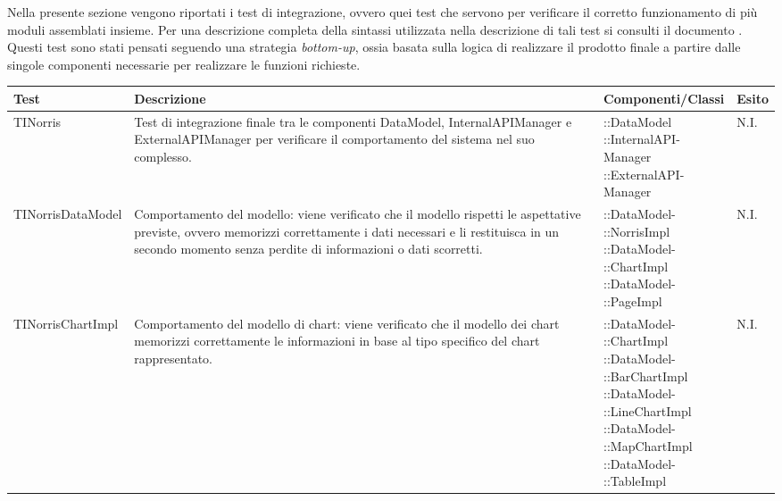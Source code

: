 	Nella presente sezione vengono riportati i test di integrazione, ovvero quei test che servono per verificare il corretto funzionamento di più moduli assemblati insieme. Per una descrizione completa della sintassi utilizzata nella descrizione di tali test si consulti il documento . \\
	Questi test sono stati pensati seguendo una strategia \textit{bottom-up}, ossia basata sulla logica di realizzare il prodotto finale a partire dalle singole componenti necessarie per realizzare le funzioni richieste.

\begin{longtabu}{| X | X | X[0.9] | X[0.3] |}

			\hline
			\rowfont{\bf}
			Test &
			Descrizione &
			Componenti/Classi &
			Esito \\
			\hline \endhead




	TINorris
	&
Test di integrazione finale tra le componenti DataModel, InternalAPIManager e ExternalAPIManager per verificare il comportamento del sistema nel suo complesso.
& \parbox[t]{0.6\textwidth}{
::DataModel\\
::InternalAPI-\\Manager\\
::ExternalAPI-\\Manager}
			& N.I.
			\\ \hline



	TINorrisDataModel
	&
Comportamento del modello: viene verificato che il modello rispetti le aspettative previste, ovvero memorizzi correttamente i dati necessari e li restituisca in un secondo momento senza perdite di informazioni o dati scorretti.
& \parbox[t]{0.6\textwidth}{
::DataModel-\\::NorrisImpl\\
::DataModel-\\::ChartImpl\\
::DataModel-\\::PageImpl}
			& N.I.
			\\ \hline



	TINorrisChartImpl
	&
Comportamento del modello di chart: viene verificato che il modello dei chart memorizzi correttamente le informazioni in base al tipo specifico del chart rappresentato.
& \parbox[t]{0.6\textwidth}{
::DataModel-\\::ChartImpl\\
::DataModel-\\::BarChartImpl\\
::DataModel-\\::LineChartImpl\\
::DataModel-\\::MapChartImpl\\
::DataModel-\\::TableImpl}
			& N.I.
			\\ \hline




\end{longtabu}
